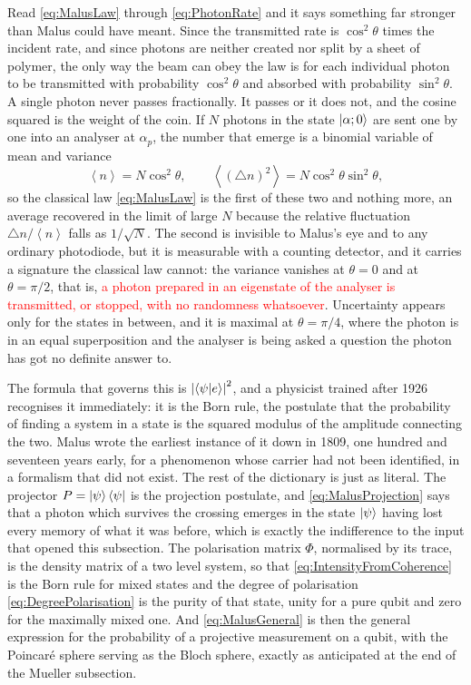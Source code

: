             Read \ref{eq:MalusLaw} through \ref{eq:PhotonRate} and it says something far stronger than Malus could have meant. Since the transmitted rate is $\cos^2\theta$ times the incident rate, and since photons are neither created nor split by a sheet of polymer, the only way the beam can obey the law is for each individual photon to be transmitted with probability $\cos^2\theta$ and absorbed with probability $\sin^2\theta$. A single photon never passes fractionally. It passes or it does not, and the cosine squared is the weight of the coin. If $N$ photons in the state $\ket{\alpha;0}$ are sent one by one into an analyser at $\alpha_p$, the number that emerge is a binomial variable of mean and variance
            \begin{equation}\label{eq:MalusBinomial}
                \left\langle n\right\rangle = N\cos^2\theta, \qquad \left\langle \left(\triangle n\right)^2\right\rangle = N\cos^2\theta\sin^2\theta ,
            \end{equation}
            so the classical law \ref{eq:MalusLaw} is the first of these two and nothing more, an average recovered in the limit of large $N$ because the relative fluctuation $\triangle n/\left\langle n\right\rangle$ falls as $1/\sqrt{N}$. The second is invisible to Malus's eye and to any ordinary photodiode, but it is measurable with a counting detector, and it carries a signature the classical law cannot: the variance vanishes at $\theta=0$ and at $\theta=\pi/2$, that is, \textcolor{red}{a photon prepared in an eigenstate of the analyser is transmitted, or stopped, with no randomness whatsoever}. Uncertainty appears only for the states in between, and it is maximal at $\theta=\pi/4$, where the photon is in an equal superposition and the analyser is being asked a question the photon has got no definite answer to.

            The formula that governs this is $\left|\braket{\psi|e}\right|^2$, and a physicist trained after 1926 recognises it immediately: it is the Born rule, the postulate that the probability of finding a system in a state is the squared modulus of the amplitude connecting the two. Malus wrote the earliest instance of it down in 1809, one hundred and seventeen years early, for a phenomenon whose carrier had not been identified, in a formalism that did not exist. The rest of the dictionary is just as literal. The projector $P=\ket{\psi}\bra{\psi}$ is the projection postulate, and \ref{eq:MalusProjection} says that a photon which survives the crossing emerges in the state $\ket{\psi}$ having lost every memory of what it was before, which is exactly the indifference to the input that opened this subsection. The polarisation matrix $\Phi$, normalised by its trace, is the density matrix of a two level system, so that \ref{eq:IntensityFromCoherence} is the Born rule for mixed states and the degree of polarisation \ref{eq:DegreePolarisation} is the purity of that state, unity for a pure qubit and zero for the maximally mixed one. And \ref{eq:MalusGeneral} is then the general expression for the probability of a projective measurement on a qubit, with the Poincaré sphere serving as the Bloch sphere, exactly as anticipated at the end of the Mueller subsection.

